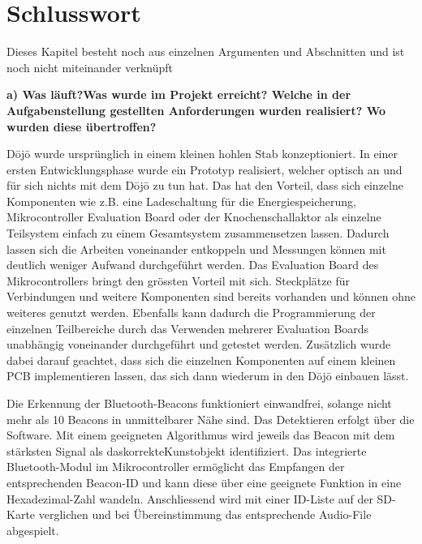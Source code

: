 \section{Schlusswort} \label{sec:schlusswort}

Dieses Kapitel besteht noch aus einzelnen Argumenten und Abschnitten und ist noch nicht miteinander verknüpft

\textbf{a) Was läuft?Was wurde im Projekt erreicht? Welche in der Aufgabenstellung gestellten Anforderungen wurden realisiert? Wo wurden diese übertroffen?}
 
Dōjō wurde ursprünglich in einem kleinen hohlen Stab konzeptioniert. In einer ersten Entwicklungsphase wurde ein Prototyp realisiert, welcher optisch an und für sich nichts mit dem Dōjō zu tun hat. Das hat den Vorteil, dass sich einzelne Komponenten wie z.B. eine Ladeschaltung für die Energiespeicherung, Mikrocontroller Evaluation Board oder der Knochenschallaktor als einzelne Teilsystem einfach zu einem Gesamtsystem zusammensetzen lassen. Dadurch lassen sich die Arbeiten voneinander entkoppeln und Messungen können mit deutlich weniger Aufwand durchgeführt werden. Das Evaluation Board des Mikrocontrollers bringt den grössten Vorteil mit sich. Steckplätze für Verbindungen und weitere Komponenten sind bereits vorhanden und können ohne weiteres genutzt werden. Ebenfalls kann dadurch die Programmierung der einzelnen Teilbereiche durch das Verwenden mehrerer Evaluation Boards unabhängig voneinander durchgeführt und getestet werden. Zusätzlich wurde dabei darauf geachtet, dass sich die einzelnen Komponenten auf einem kleinen PCB implementieren lassen, das sich dann wiederum in den Dōjō einbauen lässt.
 
Die Erkennung der Bluetooth-Beacons funktioniert einwandfrei, solange nicht mehr als 10 Beacons in unmittelbarer Nähe sind. Das Detektieren erfolgt über die Software. Mit einem geeigneten Algorithmus wird jeweils das Beacon mit dem stärksten Signal als das\glqq korrekte\grqq Kunstobjekt identifiziert. Das integrierte Bluetooth-Modul im Mikrocontroller ermöglicht das Empfangen der entsprechenden Beacon-ID und kann diese über eine geeignete Funktion in eine Hexadezimal-Zahl wandeln. Anschliessend wird mit einer ID-Liste auf der SD-Karte verglichen und bei Übereinstimmung das entsprechende Audio-File abgespielt.
  
